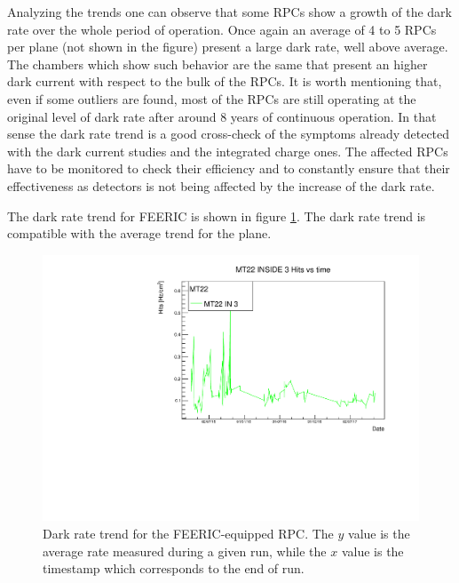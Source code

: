 Analyzing the trends one can observe that some RPCs show a growth of the dark rate over the whole period of operation.
Once again an average of 4 to 5 RPCs per plane (not shown in the figure) present a large dark rate, well above average.
The chambers which show such behavior are the same that present an higher dark current with respect to the bulk of the RPCs.
It is worth mentioning that, even if some outliers are found, most of the RPCs are still operating at the original level of dark rate after around 8 years of continuous operation.
In that sense the dark rate trend is a good cross-check of the symptoms already detected with the dark current studies and the integrated charge ones.
The affected RPCs have to be monitored to check their efficiency and to constantly ensure that their effectiveness as detectors is not being affected by the increase of the dark rate.

The dark rate trend for FEERIC is shown in figure \ref{fig:FEERICDarkRate}.
The dark rate trend is compatible with the average trend for the plane.

\begin{figure}[!t]
\begin{center}
\includegraphics[width=0.95\linewidth]{Chapters/Performance/Figs/DarkRateFEERIC.pdf}
\caption{Dark rate trend for the FEERIC-equipped RPC. The $y$ value is the average rate measured during a given run, while the $x$ value is the timestamp which corresponds to the end of run.}
\label{fig:FEERICDarkRate}
\end{center}
\end{figure}

